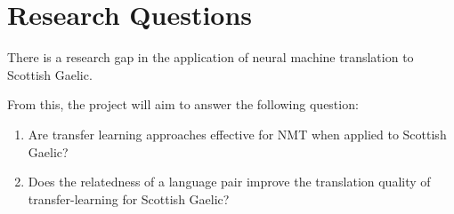 
\section{Research Questions}
There is a research gap in the application of neural machine translation to Scottish Gaelic.

From this, the project will aim to answer the following question:

\begin{enumerate}
    \item Are transfer learning approaches effective for \acrshort{NMT} when applied to Scottish Gaelic?
    \item Does the relatedness of a language pair improve the translation quality of transfer-learning for Scottish Gaelic?
\end{enumerate}

